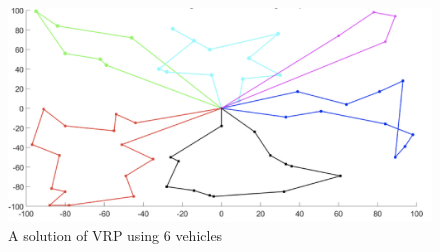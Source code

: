 \begin{figure}[h]
    \centering
    \includegraphics[width=1.0\textwidth]{images/vrp-graph.png}
    \caption{A solution of VRP using 6 vehicles}
    \label{fig:mesh1}
\end{figure}
